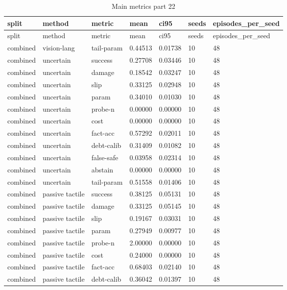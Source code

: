 \documentclass{article}
\begin{document}
\begin{center}
\tiny
\renewcommand{\arraystretch}{0.92}
\setlength{\tabcolsep}{3pt}
\begin{longtable}{lllllll}
\caption{Main metrics part 22}\label{tab:main-metrics-22}\\
\toprule
split & method & metric & mean & ci95 & seeds & episodes\_per\_seed \\
\midrule
\endfirsthead
\toprule
split & method & metric & mean & ci95 & seeds & episodes\_per\_seed \\
\midrule
\endhead
combined & vision-lang & tail-param & 0.44513 & 0.01738 & 10 & 48 \\
combined & uncertain & success & 0.27708 & 0.03446 & 10 & 48 \\
combined & uncertain & damage & 0.18542 & 0.03247 & 10 & 48 \\
combined & uncertain & slip & 0.33125 & 0.02948 & 10 & 48 \\
combined & uncertain & param & 0.34010 & 0.01030 & 10 & 48 \\
combined & uncertain & probe-n & 0.00000 & 0.00000 & 10 & 48 \\
combined & uncertain & cost & 0.00000 & 0.00000 & 10 & 48 \\
combined & uncertain & fact-acc & 0.57292 & 0.02011 & 10 & 48 \\
combined & uncertain & debt-calib & 0.31409 & 0.01082 & 10 & 48 \\
combined & uncertain & false-safe & 0.03958 & 0.02314 & 10 & 48 \\
combined & uncertain & abstain & 0.00000 & 0.00000 & 10 & 48 \\
combined & uncertain & tail-param & 0.51558 & 0.01406 & 10 & 48 \\
combined & passive tactile & success & 0.38125 & 0.05131 & 10 & 48 \\
combined & passive tactile & damage & 0.33125 & 0.05145 & 10 & 48 \\
combined & passive tactile & slip & 0.19167 & 0.03031 & 10 & 48 \\
combined & passive tactile & param & 0.27949 & 0.00977 & 10 & 48 \\
combined & passive tactile & probe-n & 2.00000 & 0.00000 & 10 & 48 \\
combined & passive tactile & cost & 0.24000 & 0.00000 & 10 & 48 \\
combined & passive tactile & fact-acc & 0.68403 & 0.02140 & 10 & 48 \\
combined & passive tactile & debt-calib & 0.36042 & 0.01397 & 10 & 48 \\

\end{longtable}
\end{center}
\end{document}
